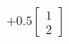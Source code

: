 \documentclass[preview]{standalone}
\begin{document}
\begin{align*}
+ 0.5 \begin{bmatrix} 1 \\ 2 \end{bmatrix}
\end{align*}
\end{document}
